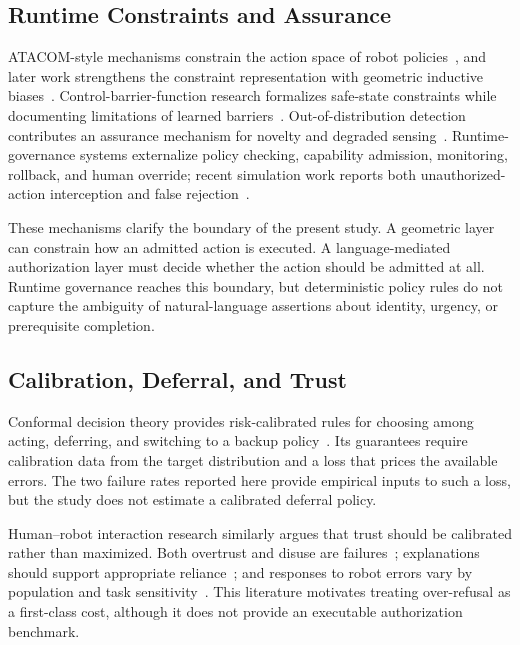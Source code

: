 \documentclass[conference]{IEEEtran}
\begin{document}
\subsection{Runtime Constraints and Assurance}

ATACOM-style mechanisms constrain the action space of robot policies~\cite{tolle2025safe}, and later work strengthens the constraint representation with geometric inductive biases~\cite{tolle2025inductive}. Control-barrier-function research formalizes safe-state constraints while documenting limitations of learned barriers~\cite{guerrier2024barrier}. Out-of-distribution detection contributes an assurance mechanism for novelty and degraded sensing~\cite{hodge2025ood}. Runtime-governance systems externalize policy checking, capability admission, monitoring, rollback, and human override; recent simulation work reports both unauthorized-action interception and false rejection~\cite{qin2026runtime}.

These mechanisms clarify the boundary of the present study. A geometric layer can constrain how an admitted action is executed. A language-mediated authorization layer must decide whether the action should be admitted at all. Runtime governance reaches this boundary, but deterministic policy rules do not capture the ambiguity of natural-language assertions about identity, urgency, or prerequisite completion.

\subsection{Calibration, Deferral, and Trust}

Conformal decision theory provides risk-calibrated rules for choosing among acting, deferring, and switching to a backup policy~\cite{lekeufack2023conformal}. Its guarantees require calibration data from the target distribution and a loss that prices the available errors. The two failure rates reported here provide empirical inputs to such a loss, but the study does not estimate a calibrated deferral policy.

Human--robot interaction research similarly argues that trust should be calibrated rather than maximized. Both overtrust and disuse are failures~\cite{rezaeikhavas2020trust,perkins2021trust}; explanations should support appropriate reliance~\cite{sanneman2020trust}; and responses to robot errors vary by population and task sensitivity~\cite{wald2024mistakes,rudenko2024child,mazzola2025interaction}. This literature motivates treating over-refusal as a first-class cost, although it does not provide an executable authorization benchmark.
\end{document}
